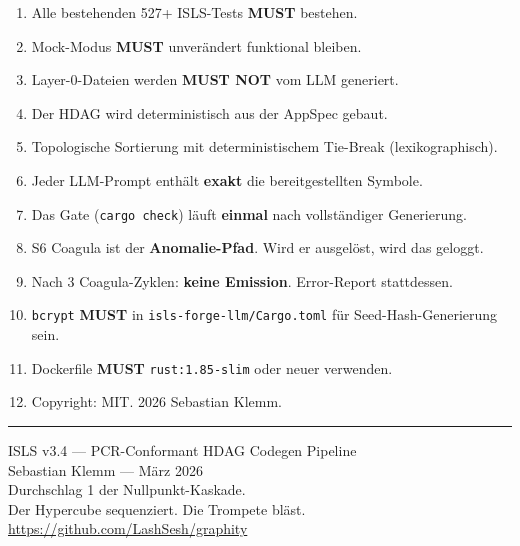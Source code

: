 \documentclass[11pt,a4paper]{article}
\newcommand{\must}{\textbf{MUST}}
\newcommand{\mustnot}{\textbf{MUST NOT}}
\begin{document}
\begin{enumerate}[nosep]
\item Alle bestehenden 527+ ISLS-Tests \must{} bestehen.
\item Mock-Modus \must{} unverändert funktional bleiben.
\item Layer-0-Dateien werden \mustnot{} vom LLM generiert.
\item Der HDAG wird deterministisch aus der AppSpec gebaut.
\item Topologische Sortierung mit deterministischem Tie-Break (lexikographisch).
\item Jeder LLM-Prompt enthält \textbf{exakt} die bereitgestellten Symbole.
\item Das Gate (\texttt{cargo check}) läuft \textbf{einmal} nach vollständiger Generierung.
\item S6 Coagula ist der \textbf{Anomalie-Pfad}. Wird er ausgelöst, wird das geloggt.
\item Nach 3 Coagula-Zyklen: \textbf{keine Emission}. Error-Report stattdessen.
\item \texttt{bcrypt} \must{} in \texttt{isls-forge-llm/Cargo.toml} für Seed-Hash-Generierung sein.
\item Dockerfile \must{} \texttt{rust:1.85-slim} oder neuer verwenden.
\item Copyright: MIT. \textcopyright{} 2026 Sebastian Klemm.
\end{enumerate}

\vfill
\noindent\rule{\textwidth}{0.4pt}
\begin{center}
\small
ISLS v3.4 --- PCR-Conformant HDAG Codegen Pipeline\\
Sebastian Klemm --- März 2026\\
Durchschlag 1 der Nullpunkt-Kaskade.\\
Der Hypercube sequenziert. Die Trompete bläst.\\
\url{https://github.com/LashSesh/graphity}
\end{center}
\end{document}
